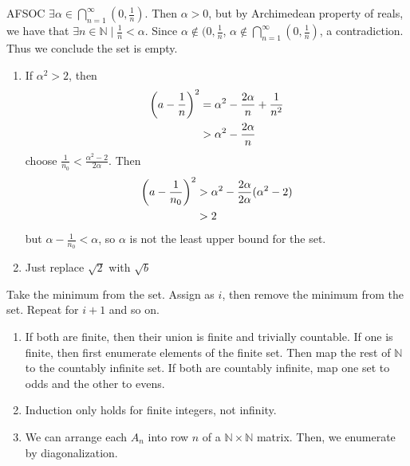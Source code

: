 \begin{exercise}
AFSOC $\exists \alpha \in \bigcap_{n=1}^\infty (0, \frac{1}{n})$. Then $\alpha >0$, but by Archimedean property of reals, we have that $\exists n \in \mathbb{N} \mid \frac{1}{n} < \alpha$. Since $\alpha \not\in (0, \frac{1}{n}$, $\alpha \not\in \bigcap_{n=1}^\infty (0, \frac{1}{n})$, a contradiction. Thus we conclude the set is empty.
\end{exercise}

\begin{exercise}
\begin{enumerate}[label=(\alph*)]
	\item If $\alpha^2 > 2$, then 
	\begin{align*}
		\left(a - \frac{1}{n}\right)^2 &= \alpha^2 - \frac{2\alpha}{n} + \frac{1}{n^2} \\
		&> \alpha^2 - \frac{2\alpha}{n}
	\end{align*}
	choose $\frac{1}{n_0} < \frac{\alpha^2 - 2}{2\alpha}$. Then
	\begin{align*}
		\left(a - \frac{1}{n_0}\right)^2 &> \alpha^2 - \frac{2\alpha}{2\alpha}(\alpha^2 - 2)\\
		&> 2
	\end{align*}
	but $\alpha - \frac{1}{n_0} < \alpha$, so $\alpha$ is not the least upper bound for the set.
	\item Just replace $\sqrt{2}$ with $\sqrt{b}$
\end{enumerate}
\end{exercise}

\begin{exercise}
	Take the minimum from the set. Assign as $i$, then remove the minimum from the set. Repeat for $i+1$ and so on.
\end{exercise}

\begin{exercise}
\begin{enumerate}[label=(\alph*)]
	\item If both are finite, then their union is finite and trivially countable. If one is finite, then first enumerate elements of the finite set. Then map the rest of $\mathbb{N}$ to the countably infinite set. If both are countably infinite, map one set to odds and the other to evens.
	\item Induction only holds for finite integers, not infinity.
	\item We can arrange each $A_n$ into row $n$ of a $\mathbb{N}\times \mathbb{N}$ matrix. Then, we enumerate by diagonalization.
\end{enumerate}
\end{exercise}

